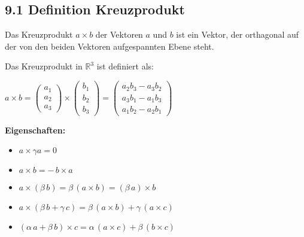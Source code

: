 \subsection{9.1 Definition Kreuzprodukt}{
\vskip1pt
Das Kreuzprodukt $a \times b$ der Vektoren $a$ und $b$ ist ein Vektor, der orthagonal auf der von den beiden Vektoren aufgespannten Ebene steht. \par
Das Kreuzprodukt in $\mathbb{R}^3$ ist definiert als:\par\vskip5pt
\begin{center}
$a \times b =
  \begin{pmatrix} a_1 \\ a_2 \\ a_3\end{pmatrix}
  \times
  \begin{pmatrix} b_1 \\ b_2 \\ b_3 \end{pmatrix}
  =
  \begin{pmatrix}
    a_2b_3 - a_3b_2 \\
    a_3b_1 - a_1b_3 \\
    a_1b_2 - a_2b_1
  \end{pmatrix}
$
\end{center}

\textbf{Eigenschaften:}
\vspace{-3pt}

\begin{itemize}[leftmargin=0.29cm, itemsep=0.5pt]
\item $a \times \gamma a = 0$
\item $a \times b = -\, b \times a$
\item $a \times(\beta\, b) = \beta\,(a \times b) = (\beta\, a)\times b$
\item $a \times(\beta\, b + \gamma\,c) = \beta\,(a \times b) + \gamma\,(a \times c)$
\item $(\alpha\, a + \beta\, b) \times c = \alpha\,(a \times c) + \beta\,(b \times c)$
\end{itemize}\vspace{-3pt}

}
\WhiteSpace
